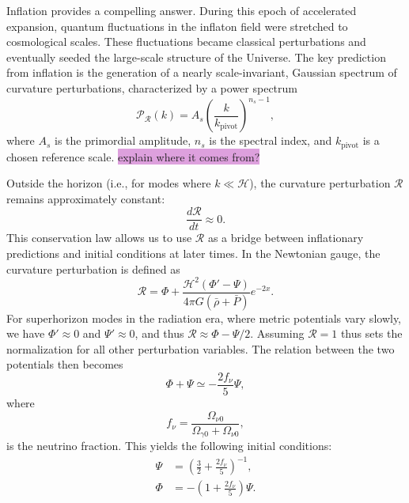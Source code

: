 \documentclass{aa}
\numberwithin{equation}{section}
\numberwithin{table}{section}
\numberwithin{figure}{section}
\begin{document}
Inflation provides a compelling answer. During this epoch of accelerated expansion, quantum fluctuations in the inflaton field were stretched to cosmological scales. These fluctuations became classical perturbations and eventually seeded the large-scale structure of the Universe. The key prediction from inflation is the generation of a nearly scale-invariant, Gaussian spectrum of curvature perturbations, characterized by a power spectrum
\begin{equation}
\mathcal{P}_{\mathcal{R}}(k) = A_s \left( \frac{k}{k_\text{pivot}} \right)^{n_s - 1},
\end{equation}
where $A_s$ is the primordial amplitude, $n_s$ is the spectral index, and $k_\text{pivot}$ is a chosen reference scale. \colorbox{Plum}{explain where it comes from?}

Outside the horizon (i.e., for modes where $k \ll \mathcal{H}$), the curvature perturbation $\mathcal{R}$ remains approximately constant:
\begin{equation}
\frac{d\mathcal{R}}{dt} \approx 0.
\end{equation}
This conservation law allows us to use $\mathcal{R}$ as a bridge between inflationary predictions and initial conditions at later times. In the Newtonian gauge, the curvature perturbation is defined as
\begin{equation}
\mathcal{R} = \Phi + \frac{\mathcal{H}^2\left( \Phi' - \Psi \right)}{4\pi G (\bar{\rho} + \bar{P})}e^{-2x}.
\end{equation}
For superhorizon modes in the radiation era, where metric potentials vary slowly, we have $\Phi' \approx 0$ and $\Psi' \approx 0$, and thus $\mathcal{R} \approx \Phi - \Psi/2$. Assuming $\mathcal{R} = 1$ thus sets the normalization for all other perturbation variables. The relation between the two potentials then becomes
\begin{equation}
\Phi + \Psi \simeq -\frac{2f_\nu}{5} \Psi,
\end{equation}
where 
\begin{equation}
  f_\nu = \frac{\Omega_{\nu 0}}{\Omega_{\gamma 0} + \Omega_{\nu 0}}, 
\end{equation}
is the neutrino fraction. This yields the following initial conditions:
\begin{align}
\Psi &= \left(\frac{3}{2} + \frac{2f_\nu}{5}\right)^{-1}, \\
\Phi &= -\left(1 + \frac{2f_\nu}{5} \right)\Psi.
\end{align}
\end{document}
